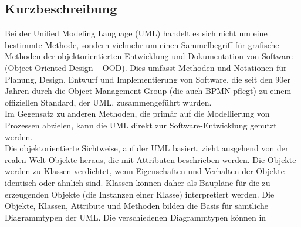 \subsection{Kurzbeschreibung}
Bei der Unified Modeling Language (UML) handelt es sich nicht um eine bestimmte Methode, sondern vielmehr um einen Sammelbegriff für grafische Methoden der objektorientierten Entwicklung und Dokumentation von Software (Object Oriented Design – OOD). Dies umfasst Methoden und Notationen für Planung, Design, Entwurf und Implementierung von Software, die seit den 90er Jahren durch die Object Management Group (die auch BPMN pflegt) zu einem offiziellen Standard, der UML, zusammengeführt wurden.\cite{MT005} \\
Im Gegensatz zu anderen Methoden, die primär auf die Modellierung von Prozessen abzielen, kann die UML direkt zur Software-Entwicklung genutzt werden.\\
Die objektorientierte Sichtweise, auf der UML basiert, zieht ausgehend von der realen Welt Objekte heraus, die mit Attributen beschrieben werden. Die Objekte werden zu Klassen verdichtet, wenn Eigenschaften und Verhalten der Objekte identisch oder ähnlich sind. Klassen können daher als Baupläne für die zu erzeugenden Objekte (die Instanzen einer Klasse) interpretiert werden. Die Objekte, Klassen, Attribute und Methoden bilden die Basis für sämtliche Diagrammtypen der UML. Die verschiedenen Diagrammtypen können in\\

